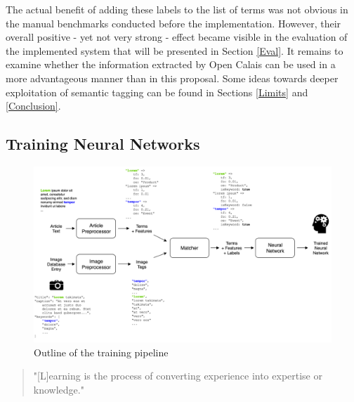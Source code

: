 \documentclass[11pt,a4paper,twoside]{article}
\begin{document}
The actual benefit of adding these labels to the list of terms was not obvious in the manual benchmarks conducted before the implementation. However, their overall positive - yet not very strong - effect became visible in the evaluation of the implemented system that will be presented in Section \ref{Eval}. It remains to examine whether the information extracted by Open Calais can be used in a more advantageous manner than in this proposal. Some ideas towards deeper exploitation of semantic tagging can be found in Sections \ref{Limits} and \ref{Conclusion}.

\subsection{Training Neural Networks} \label{SystemTrain}

\begin{figure}[t]
  \includegraphics[width=\columnwidth]{picpic-training.png}
  \caption{Outline of the training pipeline}
  \label{fig:picpic-training}
\end{figure}

\begin{quote}
    "[L]earning is the process of converting experience into expertise or knowledge."
    
    \cite[p. 1]{Shalev-Shwartz2014UnderstandingAlgorithms}
\end{quote}
\end{document}
